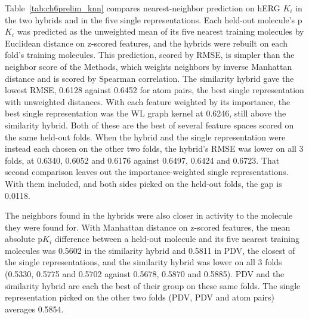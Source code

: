 Table~\ref{tab:ch6prelim_knn} compares nearest-neighbor prediction on hERG $K_i$ in the two hybrids and in the five single representations. Each held-out molecule's p$K_i$ was predicted as the unweighted mean of its five nearest training molecules by Euclidean distance on z-scored features, and the hybrids were rebuilt on each fold's training molecules. This prediction, scored by RMSE, is simpler than the neighbor score of the Methods, which weights neighbors by inverse Manhattan distance and is scored by Spearman correlation. The similarity hybrid gave the lowest RMSE, 0.6128 against 0.6452 for atom pairs, the best single representation with unweighted distances. With each feature weighted by its importance, the best single representation was the WL graph kernel at 0.6246, still above the similarity hybrid. Both of these are the best of several feature spaces scored on the same held-out folds. When the hybrid and the single representation were instead each chosen on the other two folds, the hybrid's RMSE was lower on all 3 folds, at 0.6340, 0.6052 and 0.6176 against 0.6497, 0.6424 and 0.6723. That second comparison leaves out the importance-weighted single representations. With them included, and both sides picked on the held-out folds, the gap is 0.0118.

The neighbors found in the hybrids were also closer in activity to the molecule they were found for. With Manhattan distance on z-scored features, the mean absolute p$K_i$ difference between a held-out molecule and its five nearest training molecules was 0.5602 in the similarity hybrid and 0.5811 in PDV, the closest of the single representations, and the similarity hybrid was lower on all 3 folds (0.5330, 0.5775 and 0.5702 against 0.5678, 0.5870 and 0.5885). PDV and the similarity hybrid are each the best of their group on these same folds. The single representation picked on the other two folds (PDV, PDV and atom pairs) averages 0.5854.

